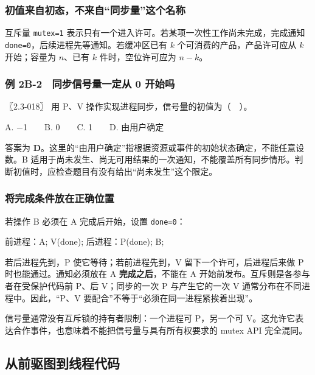 \subsubsection{初值来自初态，不来自``同步量''这个名称}\label{OS02-auto-13}

互斥量 \texttt{mutex=\allowbreak{}1} 表示只有一个进入许可。若某项一次性工作尚未完成，完成通知 \texttt{done=\allowbreak{}0}，后续进程先等通知。若缓冲区已有 \(k\) 个可消费的产品，产品许可应从 \(k\) 开始；容量为 \(n\)、已有 \(k\) 件时，空位许可应为 \(n-k\)。

\subsubsection{例 2B-2　同步信号量一定从 0 开始吗}\label{OS02-ex-err18}

\begin{example}[配套例题]

〖2.3-018〗 用 P、V 操作实现进程同步，信号量的初值为（　）。

A. \ensuremath{-}1　　B. 0　　C. 1　　D. 由用户确定

\end{example}

答案为 \textbf{D}。这里的``由用户确定''指根据资源或事件的初始状态确定，不能任意设数。B 适用于尚未发生、尚无可用结果的一次通知，不能覆盖所有同步情形。判断初值时，应检查题目有没有给出``尚未发生''这个限定。

\subsubsection{将完成条件放在正确位置}\label{OS02-auto-14}

若操作 B 必须在 A 完成后开始，设置 \texttt{done=\allowbreak{}0}：

\begin{codeblock}[language={}]
前进程：A; V(done);
后进程：P(done); B;
\end{codeblock}

若后进程先到，P 使它等待；若前进程先到，V 留下一个许可，后进程后来做 P 时也能通过。通知必须放在 A \textbf{完成之后}，不能在 A 开始前发布。互斥则是各参与者在受保护代码前 P、后 V；同步的一次 P 与产生它的一次 V 通常分布在不同进程中。因此，``P、V 要配合''不等于``必须在同一进程紧挨着出现''。

信号量通常没有互斥锁的持有者限制：一个进程可 P，另一个可 V。这允许它表达合作事件，也意味着不能把信号量与具有所有权要求的 mutex API 完全混同。

\subsection{从前驱图到线程代码}\label{OS02-precedence}

